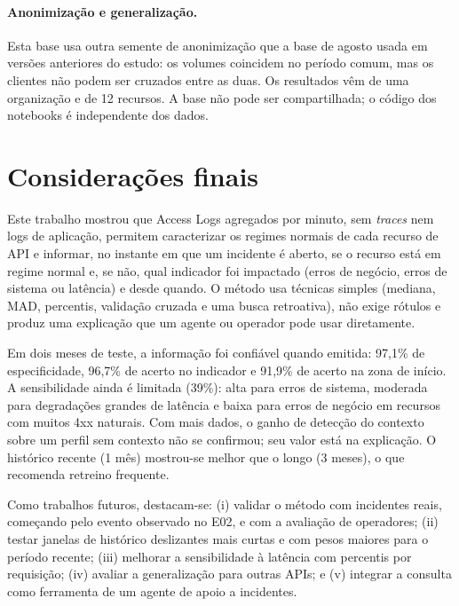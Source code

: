 \documentclass[sigconf,nonacm]{acmart}
\begin{document}
\paragraph{Anonimização e generalização.} Esta base usa outra semente de anonimização que a base de agosto usada em versões anteriores do estudo: os volumes coincidem no período comum, mas os clientes não podem ser cruzados entre as duas. Os resultados vêm de uma organização e de 12 recursos. A base não pode ser compartilhada; o código dos notebooks é independente dos dados.

\section{Considerações finais}\label{sec:conclusao}

Este trabalho mostrou que Access Logs agregados por minuto, sem \emph{traces} nem logs de aplicação, permitem caracterizar os regimes normais de cada recurso de API e informar, no instante em que um incidente é aberto, se o recurso está em regime normal e, se não, qual indicador foi impactado (erros de negócio, erros de sistema ou latência) e desde quando. O método usa técnicas simples (mediana, MAD, percentis, validação cruzada e uma busca retroativa), não exige rótulos e produz uma explicação que um agente ou operador pode usar diretamente.

Em dois meses de teste, a informação foi confiável quando emitida: 97,1\% de especificidade, 96,7\% de acerto no indicador e 91,9\% de acerto na zona de início. A sensibilidade ainda é limitada (39\%): alta para erros de sistema, moderada para degradações grandes de latência e baixa para erros de negócio em recursos com muitos 4xx naturais. Com mais dados, o ganho de detecção do contexto sobre um perfil sem contexto não se confirmou; seu valor está na explicação. O histórico recente (1 mês) mostrou-se melhor que o longo (3 meses), o que recomenda retreino frequente.

Como trabalhos futuros, destacam-se: (i) validar o método com incidentes reais, começando pelo evento observado no E02, e com a avaliação de operadores; (ii) testar janelas de histórico deslizantes mais curtas e com pesos maiores para o período recente; (iii) melhorar a sensibilidade à latência com percentis por requisição; (iv) avaliar a generalização para outras APIs; e (v) integrar a consulta como ferramenta de um agente de apoio a incidentes.



\end{document}
